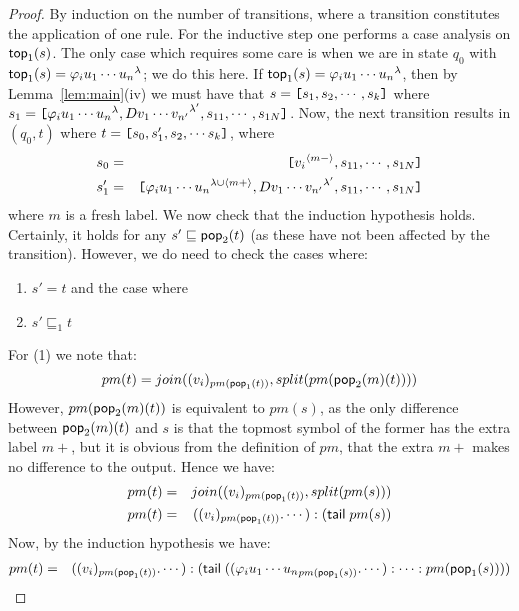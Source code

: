 \begin{proof}
By induction on the number of transitions, where a transition
constitutes the application of one rule. For the inductive step
one performs a case analysis on ${\sf top}_1(s)$. The only case which
requires some care is when we are in state $q_0$ with ${\sf top}_1(s) = {\varphi_i u_1 \cdots
u_n}^{\lambda}$; we do this here. If ${\sf top}_1(s) = {\varphi_i u_1
\cdots u_n}^{\lambda}$, then by Lemma~\ref{lem:main}(iv) we must have that $s = \hbox{\tt [}{s_1, s_2, \cdots, s_k}\hbox{\tt ]}$
where $s_1 = \hbox{\tt [}{{\varphi_i u_1 \cdots u_n}^{\lambda}, {D v_1
\cdots v_{n'}}^{ \lambda'}, s_{11}, \cdots, s_{1N}}\hbox{\tt ]} $. Now, the
next transition results in $(q_0, t)$ where $t =
\hbox{\tt [}{s_0, s_1', s_2, \cdots s_k}\hbox{\tt ]}$, where
\begin{eqnarray}
\nonumber s_0 & = & \hbox{\tt [}{{v_i}^{\langle{m-}\rangle}, s_{11}, \cdots, s_{1N}}\hbox{\tt ]}\\
\nonumber s_1' &  = & \hbox{\tt [}{{\varphi_i u_1 \cdots u_n}^{\lambda \cup \langle m+ \rangle}, {D v_1 \cdots v_{n'}}^{\lambda'}, s_{11}, \cdots, s_{1N}}\hbox{\tt ]}
\end{eqnarray}
where $m$ is a fresh label. We now check that the induction
hypothesis holds. Certainly, it holds for any $s' \sqsubseteq
{\sf pop}_2(t)$ (as these have not been affected by the transition).
However, we do need to check the cases where:
\begin{enumerate}\item $s' = t$ and the case where\item  $s' \sqsubseteq_1
t$\end{enumerate}
For (1) we note that:
\begin{equation}
\nonumber pm(t) = join((v_i)_{pm({\sf pop}_1(t))}, split(pm({\sf pop}_2(m)(t))))
\end{equation}
However, $pm({\sf pop}_2(m)(t))$ is equivalent to $pm(s)$, as the only
difference between ${\sf pop}_2(m)(t)$ and $s$ is that the topmost
symbol of the former has the extra label $m+$, but it is obvious
from the definition of $pm$, that the extra $m+$ makes no
difference to the output. Hence we have:
\begin{eqnarray}
\nonumber pm(t) & = & join((v_i)_{pm({\sf pop}_1(t))}, split(pm(s)))\\
\nonumber pm(t) & = & ((v_i)_{pm({\sf pop}_1(t))} . \cdots) : ({\sf tail}\;pm(s))
\end{eqnarray}
Now, by the induction hypothesis we have:
\begin{eqnarray}
\nonumber pm(t) & = & ((v_i)_{pm(\pop_1(t))} . \cdots) : ({\sf tail}\;((\varphi_i u_1 \cdots {u_n}_{pm(\pop_1(s))} . \cdots) : \cdots : pm(\pop_1(s)))) \\

\end{eqnarray}
\end{proof}
